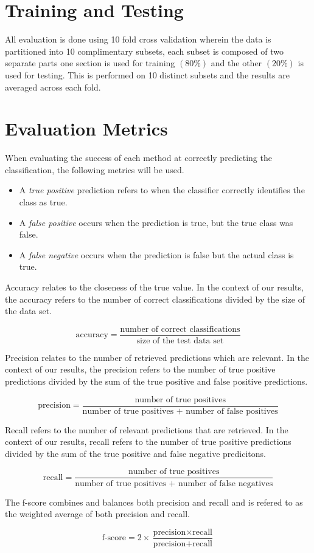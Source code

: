\section{Training and Testing}
\label{sec:tt}

All evaluation is done using 10 fold cross validation wherein the data is partitioned into 10 complimentary subsets, each subset is composed 
of two separate parts one section is used for training $(80\%)$ and the other $(20\%)$ is used for testing. This is performed on 10 distinct 
subsets and the results are averaged across each fold.

\section{Evaluation Metrics}
\label{sec:notation}

When evaluating the success of each method at correctly predicting the classification, the following metrics will be used.

\begin{itemize}
\item A \emph{true positive} prediction refers to when the classifier correctly identifies the class as true. 
\item A \emph{false positive} occurs when the prediction is true, but the true class was false. 
\item A \emph{false negative} occurs when the prediction is false but the actual class is true.
\end{itemize}

Accuracy relates to the closeness of the true value. In the context of our results, the accuracy refers to the number of correct classifications 
divided by the size of the data set.

\[
 \text{accuracy} = \frac{\text{number of correct classifications}}{\text{size of the test data set}}
\]

Precision relates to the number of retrieved predictions which are relevant. In the context of our results, the precision refers to the number of true positive predictions 
divided by the sum of the true positive and false positive predictions.

\[
 \text{precision} = \frac{\text{number of true positives}}{\text{number of true positives + number of false positives}}
\]

Recall refers to the number of relevant predictions that are retrieved. In the context of our results, recall refers to the number of true positive predictions 
divided by the sum of the true positive and false negative predicitons.

\[
 \text{recall} = \frac{\text{number of true positives}}{\text{number of true positives + number of false negatives}}
\]

The f-score combines and balances both precision and recall and is refered to as the weighted average of both precision and recall. 

\[
 \text{f-score} = 2 \times \frac{\text{precision} \times \text{recall}}{\text{precision} + \text{recall}}
\]

